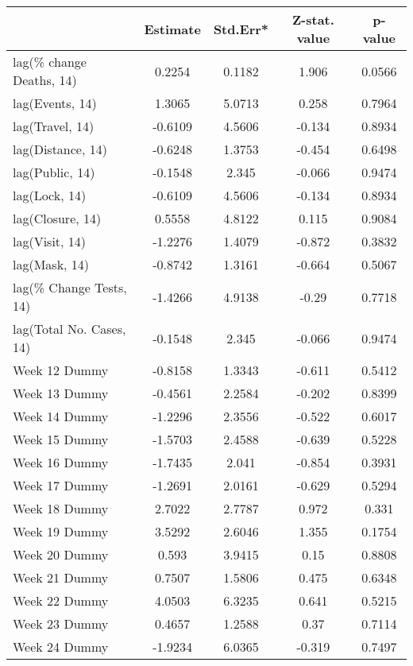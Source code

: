 \begingroup\tiny
\begin{longtable}{lcccc}
  \toprule
 & Estimate & Std.Err* & Z-stat. value & p-value \\ 
  \midrule
lag(\% change Deaths, 14) & 0.2254 & 0.1182 & 1.906 & 0.0566 \\ 
  lag(Events, 14) & 1.3065 & 5.0713 & 0.258 & 0.7964 \\ 
  lag(Travel, 14) & -0.6109 & 4.5606 & -0.134 & 0.8934 \\ 
  lag(Distance, 14) & -0.6248 & 1.3753 & -0.454 & 0.6498 \\ 
  lag(Public, 14) & -0.1548 & 2.345 & -0.066 & 0.9474 \\ 
  lag(Lock, 14) & -0.6109 & 4.5606 & -0.134 & 0.8934 \\ 
  lag(Closure, 14) & 0.5558 & 4.8122 & 0.115 & 0.9084 \\ 
  lag(Visit, 14) & -1.2276 & 1.4079 & -0.872 & 0.3832 \\ 
  lag(Mask, 14) & -0.8742 & 1.3161 & -0.664 & 0.5067 \\ 
  lag(\% Change Tests, 14) & -1.4266 & 4.9138 & -0.29 & 0.7718 \\ 
  lag(Total No. Cases, 14) & -0.1548 & 2.345 & -0.066 & 0.9474 \\ 
  Week 12 Dummy & -0.8158 & 1.3343 & -0.611 & 0.5412 \\ 
  Week 13 Dummy & -0.4561 & 2.2584 & -0.202 & 0.8399 \\ 
  Week 14 Dummy & -1.2296 & 2.3556 & -0.522 & 0.6017 \\ 
  Week 15 Dummy & -1.5703 & 2.4588 & -0.639 & 0.5228 \\ 
  Week 16 Dummy & -1.7435 & 2.041 & -0.854 & 0.3931 \\ 
  Week 17 Dummy & -1.2691 & 2.0161 & -0.629 & 0.5294 \\ 
  Week 18 Dummy & 2.7022 & 2.7787 & 0.972 & 0.331 \\ 
  Week 19 Dummy & 3.5292 & 2.6046 & 1.355 & 0.1754 \\ 
  Week 20 Dummy & 0.593 & 3.9415 & 0.15 & 0.8808 \\ 
  Week 21 Dummy & 0.7507 & 1.5806 & 0.475 & 0.6348 \\ 
  Week 22 Dummy & 4.0503 & 6.3235 & 0.641 & 0.5215 \\ 
  Week 23 Dummy & 0.4657 & 1.2588 & 0.37 & 0.7114 \\ 
  Week 24 Dummy & -1.9234 & 6.0365 & -0.319 & 0.7497 \\ 

\end{longtable}
